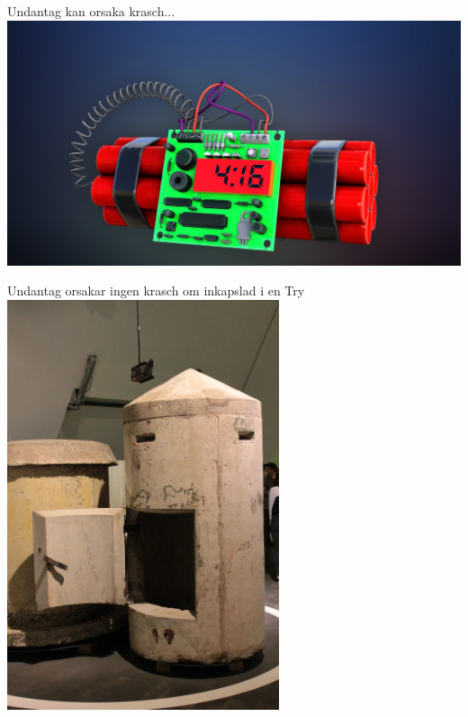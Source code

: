 




\ifkompendium\else
\begin{SlideExtra}{Undantag kan orsaka krasch...}
\includegraphics[width=1.0\textwidth]{../img/dynamite}  
\end{SlideExtra}

\begin{SlideExtra}{Undantag orsakar ingen krasch om inkapslad i en Try}
\hspace{0.3\textwidth}\includegraphics[width=0.6\textwidth,angle=-90,origin=c]{../img/bomb-shelter}  
\end{SlideExtra}
\fi

